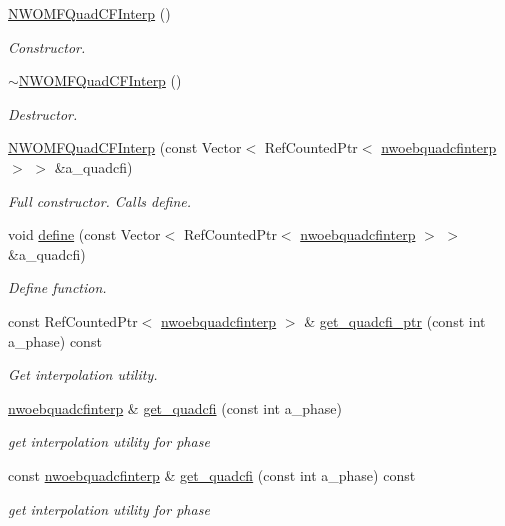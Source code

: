 \begin{DoxyCompactItemize}
\item 
\hyperlink{classNWOMFQuadCFInterp_a5dc9f6143d7bf18677068abfe89cb8aa}{N\+W\+O\+M\+F\+Quad\+C\+F\+Interp} ()
\begin{DoxyCompactList}\small\item\em Constructor. \end{DoxyCompactList}\item 
\hyperlink{classNWOMFQuadCFInterp_a3a5b70cf80e8322ab27af7b73657c8cd}{$\sim$\+N\+W\+O\+M\+F\+Quad\+C\+F\+Interp} ()
\begin{DoxyCompactList}\small\item\em Destructor. \end{DoxyCompactList}\item 
\hyperlink{classNWOMFQuadCFInterp_aeb0795858ad588e569e3629c5fae4386}{N\+W\+O\+M\+F\+Quad\+C\+F\+Interp} (const Vector$<$ Ref\+Counted\+Ptr$<$ \hyperlink{classnwoebquadcfinterp}{nwoebquadcfinterp} $>$ $>$ \&a\+\_\+quadcfi)
\begin{DoxyCompactList}\small\item\em Full constructor. Calls define. \end{DoxyCompactList}\item 
void \hyperlink{classNWOMFQuadCFInterp_a97454a2a2ce0a1cc22da20d530e85f43}{define} (const Vector$<$ Ref\+Counted\+Ptr$<$ \hyperlink{classnwoebquadcfinterp}{nwoebquadcfinterp} $>$ $>$ \&a\+\_\+quadcfi)
\begin{DoxyCompactList}\small\item\em Define function. \end{DoxyCompactList}\item 
const Ref\+Counted\+Ptr$<$ \hyperlink{classnwoebquadcfinterp}{nwoebquadcfinterp} $>$ \& \hyperlink{classNWOMFQuadCFInterp_af9fd3ab342eb940ceb50ec056cc4f66f}{get\+\_\+quadcfi\+\_\+ptr} (const int a\+\_\+phase) const 
\begin{DoxyCompactList}\small\item\em Get interpolation utility. \end{DoxyCompactList}\item 
\hyperlink{classnwoebquadcfinterp}{nwoebquadcfinterp} \& \hyperlink{classNWOMFQuadCFInterp_af18484c644d8757caba202e4abdabacc}{get\+\_\+quadcfi} (const int a\+\_\+phase)
\begin{DoxyCompactList}\small\item\em get interpolation utility for phase \end{DoxyCompactList}\item 
const \hyperlink{classnwoebquadcfinterp}{nwoebquadcfinterp} \& \hyperlink{classNWOMFQuadCFInterp_abda6ac34a5fe819136bdeba3e2acf5a7}{get\+\_\+quadcfi} (const int a\+\_\+phase) const 
\begin{DoxyCompactList}\small\item\em get interpolation utility for phase \end{DoxyCompactList}\end{DoxyCompactItemize}
